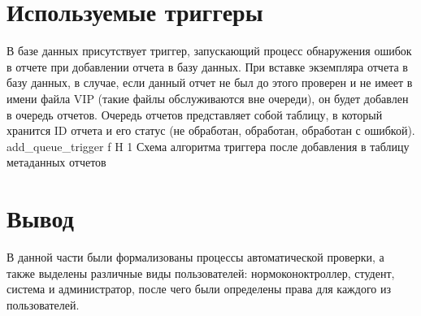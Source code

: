 \section{Используемые триггеры}
В базе данных присутствует триггер, запускающий процесс обнаружения ошибок в отчете при добавлении отчета в базу данных. При вставке экземпляра отчета в базу данных, в случае, если данный отчет не был до этого проверен и не имеет в имени файла VIP (такие файлы обслуживаются вне очереди), он будет добавлен в очередь отчетов. Очередь отчетов представляет собой таблицу, в который хранится ID отчета и его статус (не обработан, обработан, обработан с ошибкой).
{add_queue_trigger} %
{f} %
{H} %
{1\textwidth} %
{Схема алгоритма триггера после добавления в таблицу метаданных отчетов} %







\section*{Вывод}
В данной части были формализованы процессы автоматической проверки, а также выделены различные виды пользователей: нормоконоктроллер, студент, система и администратор, после чего были определены права для каждого из пользователей.




